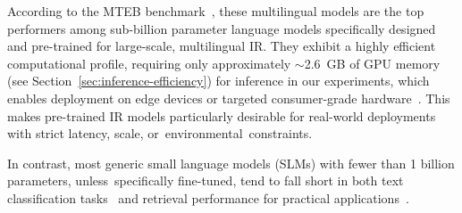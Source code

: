 \documentclass[make,article,accept,pdftex,moreauthors]{Definitions/mdpi}
\begin{document}
According to the MTEB benchmark~\citep{enevoldsen2025mmtebmassivemultilingualtext}, these multilingual models are the top performers among sub-billion parameter language models specifically designed and pre-trained for large-scale, multilingual IR. 
They exhibit a highly efficient computational profile, requiring only approximately \(\sim\)2.6~GB of GPU memory (see Section~\ref{sec:inference-efficiency}) for inference in our experiments, which enables deployment on edge devices or targeted consumer-grade hardware~\citep{jang2025edgefirstlanguagemodelinference}.
This makes pre-trained IR models particularly desirable for real-world deployments with strict latency, scale, or~environmental~constraints.

In contrast, most generic small language models (SLMs) with fewer than 1 billion parameters, unless~specifically fine-tuned, tend to fall short in both text classification tasks~\citep{bucher2024finetunedsmallllmsstill, galke2025reallymakingprogresstext} and retrieval performance for practical applications~\citep{enevoldsen2025mmtebmassivemultilingualtext}.
\end{document}
